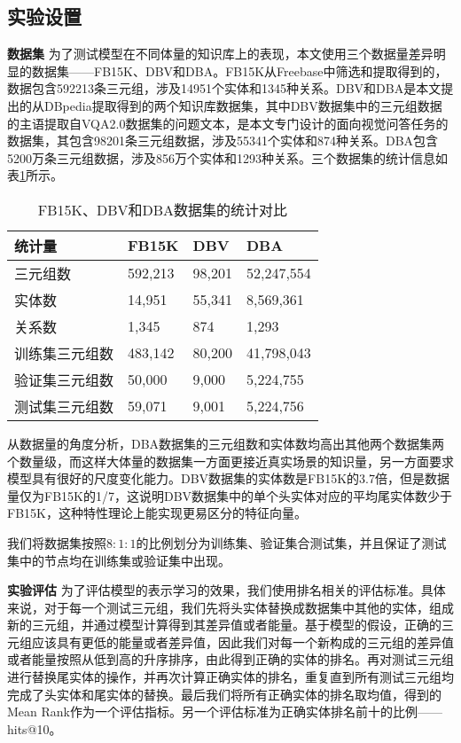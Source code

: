 \subsection{实验设置}

\textbf{数据集}\qquad
为了测试模型在不同体量的知识库上的表现，本文使用三个数据量差异明显的数据集——FB15K、DBV和DBA。FB15K从Freebase中筛选和提取得到的，数据包含592213条三元组，涉及14951个实体和1345种关系。DBV和DBA是本文提出的从DBpedia提取得到的两个知识库数据集，其中DBV数据集中的三元组数据的主语提取自VQA2.0数据集的问题文本，是本文专门设计的面向视觉问答任务的数据集，其包含98201条三元组数据，涉及55341个实体和874种关系。DBA包含5200万条三元组数据，涉及856万个实体和1293种关系。三个数据集的统计信息如表\ref{3kb}所示。
\begin{table}[H]
\centering
\caption{FB15K、DBV和DBA数据集的统计对比}
\begin{tabular}{llll}
\toprule
统计量 & FB15K & DBV & DBA \\
\midrule
三元组数 & 592,213 & 98,201 & 52,247,554 \\
实体数 & 14,951 &  55,341 &  8,569,361 \\
关系数 & 1,345 & 874 & 1,293 \\
训练集三元组数 & 483,142 & 80,200 & 41,798,043\\
验证集三元组数 & 50,000 & 9,000 & 5,224,755\\
测试集三元组数 & 59,071 & 9,001 & 5,224,756\\
\bottomrule
\end{tabular}
\label{3kb}
\end{table}

从数据量的角度分析，DBA数据集的三元组数和实体数均高出其他两个数据集两个数量级，而这样大体量的数据集一方面更接近真实场景的知识量，另一方面要求模型具有很好的尺度变化能力。DBV数据集的实体数是FB15K的3.7倍，但是数据量仅为FB15K的1/7，这说明DBV数据集中的单个头实体对应的平均尾实体数少于FB15K，这种特性理论上能实现更易区分的特征向量。

我们将数据集按照$8:1:1$的比例划分为训练集、验证集合测试集，并且保证了测试集中的节点均在训练集或验证集中出现。

\textbf{实验评估}\qquad
为了评估模型的表示学习的效果，我们使用排名相关的评估标准。具体来说，对于每一个测试三元组，我们先将头实体替换成数据集中其他的实体，组成新的三元组，并通过模型计算得到其差异值或者能量。基于模型的假设，正确的三元组应该具有更低的能量或者差异值，因此我们对每一个新构成的三元组的差异值或者能量按照从低到高的升序排序，由此得到正确的实体的排名。再对测试三元组进行替换尾实体的操作，并再次计算正确实体的排名，重复直到所有测试三元组均完成了头实体和尾实体的替换。最后我们将所有正确实体的排名取均值，得到的Mean Rank作为一个评估指标。另一个评估标准为正确实体排名前十的比例——hits@10。

